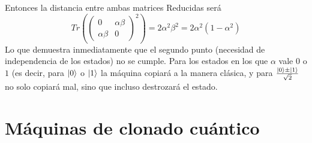 \documentclass{book}
\begin{document}
Entonces la distancia entre ambas matrices Reducidas será
\begin{equation}\label{eq2.12}{Tr(\begin{pmatrix}0&\alpha\beta \\ \alpha\beta &0\end{pmatrix}^2)=2\alpha^2 \beta^2=2\alpha^2(1-\alpha^2)}\end{equation}
Lo que demuestra inmediatamente que el segundo punto (necesidad de independencia de los estados) no se cumple. Para los estados en los que $\alpha$ vale $0$ o $1$ (es decir, para $\ket{0}$ o $\ket{1}$ la máquina copiará a la manera clásica, y para $\frac{\ket{0}\pm\ket{1}}{\sqrt{2}}$ no solo copiará mal, sino que incluso destrozará el estado.
\section{Máquinas de clonado cuántico}
\end{document}
